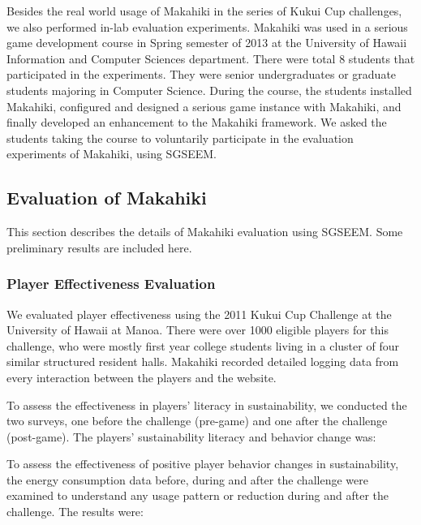 \documentclass{sigchi}
\begin{document}
Besides the real world usage of Makahiki in the series of Kukui Cup challenges, we also
performed in-lab evaluation experiments. Makahiki was used in a serious game development
course in Spring semester of 2013 at the University of Hawaii Information and Computer Sciences department. There
were total 8 students that participated in the experiments. They were senior undergraduates
 or graduate students majoring in Computer Science. During the course, the students
installed Makahiki, configured and designed a serious game instance with Makahiki, and
finally developed an enhancement to the Makahiki framework. We asked the students taking
the course to voluntarily participate in the evaluation experiments of Makahiki, using
SGSEEM.

\subsection{Evaluation of Makahiki}

This section describes the details of Makahiki evaluation using SGSEEM. Some preliminary results are included here.

\subsubsection{Player Effectiveness Evaluation}

We evaluated player effectiveness using the 2011 Kukui Cup Challenge at
the University of Hawaii at Manoa. There were over 1000 eligible players
for this challenge, who were mostly first year college students living
in a cluster of four similar structured resident halls. Makahiki
recorded detailed logging data from every interaction between the
players and the website.

To assess the effectiveness in players' literacy in sustainability, we conducted
the two surveys, one before the challenge (pre-game) and
one after the challenge (post-game). The players' sustainability
literacy and behavior change was:

To assess the effectiveness of positive player behavior changes in sustainability, the
energy consumption data before, during and after the challenge were
examined to understand any usage pattern or reduction during and after
the challenge. The results were:
\end{document}

